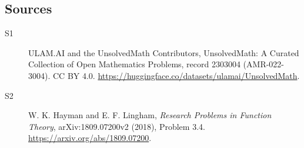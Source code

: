 \documentclass[11pt]{article}
\begin{document}
\subsection{Sources}
\begin{description}
\item[\hypertarget{source:2303004:1}{S1}] ULAM.AI and the UnsolvedMath Contributors, UnsolvedMath: A Curated Collection of Open Mathematics Problems, record 2303004 (AMR-022-3004). CC BY 4.0. \url{https://huggingface.co/datasets/ulamai/UnsolvedMath}.
\item[\hypertarget{source:2303004:2}{S2}] W. K. Hayman and E. F. Lingham, \emph{Research Problems in Function Theory}, arXiv:1809.07200v2 (2018), Problem 3.4. \url{https://arxiv.org/abs/1809.07200}.
\end{description}
\label{end:2303004}
\end{document}
